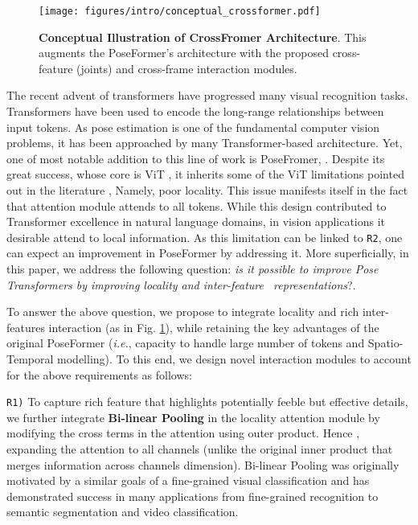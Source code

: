 \documentclass[runningheads]{llncs}
\begin{document}
\begin{figure}[t!]
    \centering
    \texttt{[image: figures/intro/conceptual\_crossformer.pdf]}
    \caption{\textbf{Conceptual Illustration of CrossFromer Architecture}. This augments the PoseFormer\cite{poseformer}'s architecture with the proposed cross-feature (joints) and cross-frame interaction modules.}
    \label{fig:conceptual}
\vspace{-2em}
\end{figure}
The recent advent of transformers \cite{transformers} have progressed many visual recognition tasks. Transformers have been used to encode the long-range relationships between input tokens. As pose estimation is one of the fundamental computer vision problems, it has been approached by many Transformer-based architecture. Yet, one of most notable addition to this line of work is PoseFromer, \cite{poseformer}. Despite its great success, whose core is ViT \cite{dosovitskiy2020image}, it inherits some of the ViT limitations pointed out in the literature \cite{li2021localvit}, Namely, poor locality. This issue manifests itself in the fact that attention module attends to all tokens. While this design contributed to Transformer excellence in natural language domains, in vision applications it desirable attend to local information. As this limitation can be linked to \texttt{R2}, one can expect an improvement in PoseFormer by addressing it. More superficially, in this paper, we address the following question: \textit{is it possible to improve  Pose Transformers by improving locality and inter-feature ~representations}?. 

To answer the above question, we propose to integrate locality and rich inter-features interaction (as in Fig. \ref{fig:conceptual}), while retaining the key advantages of the original PoseFormer\cite{poseformer} (\textit{i.e.}, capacity to handle large number of tokens and Spatio-Temporal modelling). To this end, we design novel interaction modules to account for the above requirements as follows:


\texttt{R1)} To capture rich feature that highlights potentially feeble but effective details, we further integrate \textbf{Bi-linear Pooling} \cite{yue2018compact}  in the locality attention module by modifying the cross terms in the attention using outer product. Hence , expanding the attention to all channels (unlike the original inner product that merges information across channels dimension). Bi-linear Pooling was originally motivated by a similar goals of a fine-grained visual classification and has demonstrated success in many applications \cite{yu2021fast} from fine-grained recognition to  semantic segmentation and video classification. 
\end{document}
